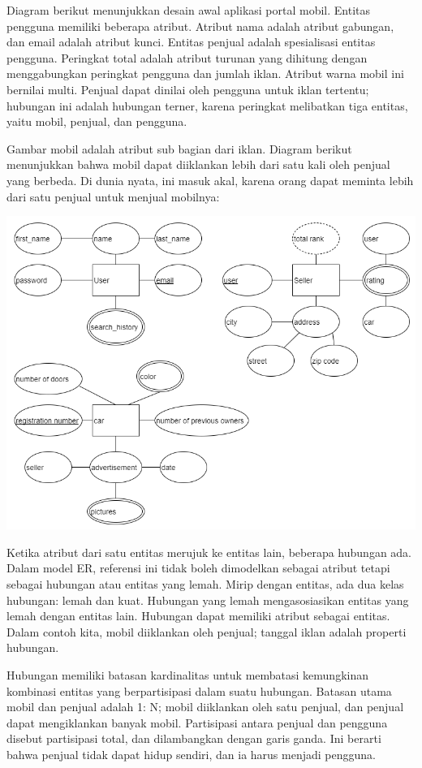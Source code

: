 \documentclass[]{book}
\begin{document}
Diagram berikut menunjukkan desain awal aplikasi portal mobil. Entitas pengguna memiliki beberapa atribut. Atribut nama adalah atribut gabungan, dan email adalah atribut kunci. Entitas penjual adalah spesialisasi entitas pengguna. Peringkat total adalah atribut turunan yang dihitung dengan menggabungkan peringkat pengguna dan jumlah iklan. Atribut warna mobil ini bernilai multi. Penjual dapat dinilai oleh pengguna untuk iklan tertentu; hubungan ini adalah hubungan terner, karena peringkat melibatkan tiga entitas, yaitu mobil, penjual, dan pengguna.

Gambar mobil adalah atribut sub bagian dari iklan. Diagram berikut menunjukkan bahwa mobil dapat diiklankan lebih dari satu kali oleh penjual yang berbeda. Di dunia nyata, ini masuk akal, karena orang dapat meminta lebih dari satu penjual untuk menjual mobilnya:

\begin{center}\includegraphics[width=0.7\linewidth]{img/01/db_model2} \end{center}

Ketika atribut dari satu entitas merujuk ke entitas lain, beberapa hubungan ada. Dalam model ER, referensi ini tidak boleh dimodelkan sebagai atribut tetapi sebagai hubungan atau entitas yang lemah. Mirip dengan entitas, ada dua kelas hubungan: lemah dan kuat. Hubungan yang lemah mengasosiasikan entitas yang lemah dengan entitas lain. Hubungan dapat memiliki atribut sebagai entitas. Dalam contoh kita, mobil diiklankan oleh penjual; tanggal iklan adalah properti hubungan.

Hubungan memiliki batasan kardinalitas untuk membatasi kemungkinan kombinasi entitas yang berpartisipasi dalam suatu hubungan. Batasan utama mobil dan penjual adalah 1: N; mobil diiklankan oleh satu penjual, dan penjual dapat mengiklankan banyak mobil. Partisipasi antara penjual dan pengguna disebut partisipasi total, dan dilambangkan dengan garis ganda. Ini berarti bahwa penjual tidak dapat hidup sendiri, dan ia harus menjadi pengguna.
\end{document}
